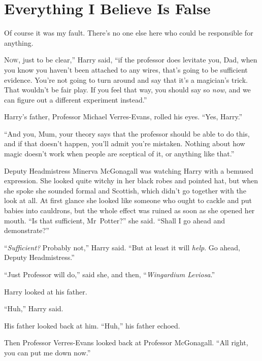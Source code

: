 \chapter{Everything I Believe Is False}

\begin{chapterOpeningQuote}
Of course it was my fault. There's no one else here who could be responsible for anything.
\end{chapterOpeningQuote}

\lettrine[ante=“]{N}{ow}, just to be clear,” Harry said, “if the professor does levitate you, Dad, when you know you haven’t been attached to any wires, that’s going to be sufficient evidence. You’re not going to turn around and say that it’s a magician’s trick. That wouldn’t be fair play. If you feel that way, you should say so \emph{now}, and we can figure out a different experiment instead.”

Harry’s father, Professor Michael Verres-Evans, rolled his eyes. “Yes, Harry.”

“And you, Mum, your theory says that the professor should be able to do this, and if that doesn’t happen, you’ll admit you’re mistaken. Nothing about how magic doesn’t work when people are sceptical of it, or anything like that.”

Deputy Headmistress Minerva McGonagall was watching Harry with a bemused expression. She looked quite witchy in her black robes and pointed hat, but when she spoke she sounded formal and Scottish, which didn’t go together with the look at all. At first glance she looked like someone who ought to cackle and put babies into cauldrons, but the whole effect was ruined as soon as she opened her mouth. “Is that sufficient, Mr~Potter?” she said. “Shall I go ahead and demonstrate?”

“\emph{Sufficient?} Probably not,” Harry said. “But at least it will \emph{help}. Go ahead, Deputy Headmistress.”

“Just Professor will do,” said she, and then, “\emph{Wingardium Leviosa}.”

Harry looked at his father.

“Huh,” Harry said.

His father looked back at him. “Huh,” his father echoed.

Then Professor Verres-Evans looked back at Professor McGonagall. “All right, you can put me down now.”

